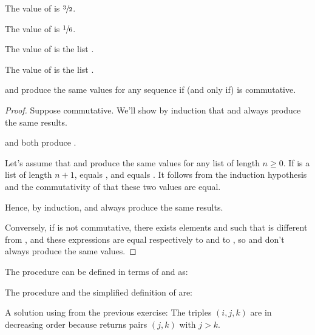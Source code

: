 \begin{exe}[2.38]
    The value of  is $\sfrac{3}{2}$.

    The value of  is $\sfrac{1}{6}$.

    The value of  is the list
    .

    The value of  is the list
    .

     and  produce the same values for any 
    sequence  if (and only if)  is commutative.

    \begin{proof}
        Suppose  commutative. We’ll show by induction that 
         and  always produce the same results.

         and
         both produce .

        Let’s assume that  and  produce the 
        same values for any list of length $n \geq 0$. If  is 
        a list of length $n + 1$,
         equals\linebreak
        , and
         equals
        . It 
        follows from the induction hypothesis and the commutativity of  
        that these two values are equal.

        Hence, by induction,  and  always 
        produce the same results.

        Conversely, if  is not commutative, there exists elements 
         and  such that  is different from
        , and these expressions are equal respectively to
         and to
        , so  and 
         don’t always produce the same values.
    \end{proof}
\end{exe}

\begin{exe}[2.39]
    The procedure  can be defined in terms of  and 
     as:
\end{exe}

\begin{exe}[2.40]
    The procedure  and the simplified definition of 
     are:
\end{exe}

\begin{exe}[2.41]
    A solution using  from the previous exercise:
    The triples $(i, j, k)$ are in decreasing order because  
    returns pairs $(j, k)$ with $j > k$.
\end{exe}
